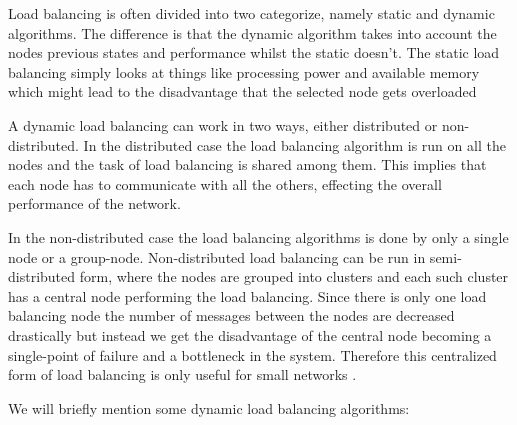 \documentclass{cslthse-msc}
\begin{document}
Load balancing is often divided into two categorize, namely static and dynamic algorithms. The difference is that the dynamic algorithm takes into account the nodes previous states and performance whilst the static doesn't. The static load balancing simply looks at things like processing power and available memory which might lead to the disadvantage that the selected node gets overloaded \cite{perfAnalysisLoadCloud}

A dynamic load balancing can work in two ways, either distributed or non-distributed. In the distributed case the load balancing algorithm is run on all the nodes and the task of load  balancing is shared among them. This implies that each node has to communicate with all the others, effecting the overall performance of the network. %

In the non-distributed case the load balancing algorithms is done by only a single node or a group-node. Non-distributed load balancing can be run in semi-distributed form, where the nodes are grouped into clusters and each such cluster has a central node performing the load balancing. Since there is only one load balancing node the number of messages between the nodes are decreased drastically but instead we get the disadvantage of the central node becoming a single-point of failure and a bottleneck in the system. Therefore this centralized form of load balancing is only useful for small networks \cite{perfAnalysisLoadCloud}.

We will briefly mention some dynamic load balancing algorithms: %
\end{document}
